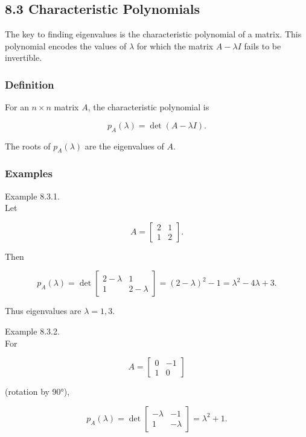 \documentclass[
  12pt,
  a4paper,
]{article}
\begin{document}
\subsection{8.3 Characteristic
Polynomials}\label{83-characteristic-polynomials}

The key to finding eigenvalues is the characteristic polynomial of a
matrix. This polynomial encodes the values of \(\lambda\) for which the
matrix \(A - \lambda I\) fails to be invertible.

\subsubsection{Definition}\label{definition-7}

For an \(n \times n\) matrix \(A\), the characteristic polynomial is

\[p_A(\lambda) = \det(A - \lambda I).\]

The roots of \(p_A(\lambda)\) are the eigenvalues of \(A\).

\subsubsection{Examples}\label{examples-8}

Example 8.3.1.\\
Let

\[A = \begin{bmatrix} 2 & 1 \\ 1 & 2 \end{bmatrix}.\]

Then

\[p_A(\lambda) = \det\!\begin{bmatrix} 2-\lambda & 1 \\ 1 & 2-\lambda \end{bmatrix}
= (2-\lambda)^2 - 1 = \lambda^2 - 4\lambda + 3.\]

Thus eigenvalues are \(\lambda = 1, 3\).

Example 8.3.2.\\
For

\[A = \begin{bmatrix} 0 & -1 \\ 1 & 0 \end{bmatrix}\]

(rotation by 90°),

\[p_A(\lambda) = \det\!\begin{bmatrix} -\lambda & -1 \\ 1 & -\lambda \end{bmatrix}
= \lambda^2 + 1.\]
\end{document}
